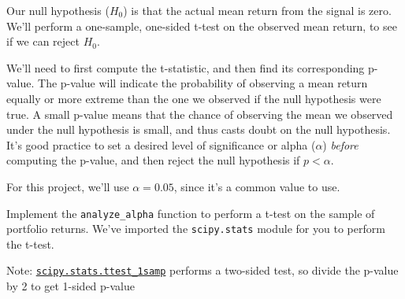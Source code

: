 \documentclass[11pt]{article}
\begin{document}
Our null hypothesis (\(H_0\)) is that the actual mean return from the
signal is zero. We'll perform a one-sample, one-sided t-test on the
observed mean return, to see if we can reject \(H_0\).

We'll need to first compute the t-statistic, and then find its
corresponding p-value. The p-value will indicate the probability of
observing a mean return equally or more extreme than the one we observed
if the null hypothesis were true. A small p-value means that the chance
of observing the mean we observed under the null hypothesis is small,
and thus casts doubt on the null hypothesis. It's good practice to set a
desired level of significance or alpha (\(\alpha\)) \emph{before}
computing the p-value, and then reject the null hypothesis if
\(p < \alpha\).

For this project, we'll use \(\alpha = 0.05\), since it's a common value
to use.

Implement the \texttt{analyze\_alpha} function to perform a t-test on
the sample of portfolio returns. We've imported the \texttt{scipy.stats}
module for you to perform the t-test.

Note:
\href{https://docs.scipy.org/doc/scipy-1.0.0/reference/generated/scipy.stats.ttest_1samp.html}{\texttt{scipy.stats.ttest\_1samp}}
performs a two-sided test, so divide the p-value by 2 to get 1-sided
p-value
\end{document}

